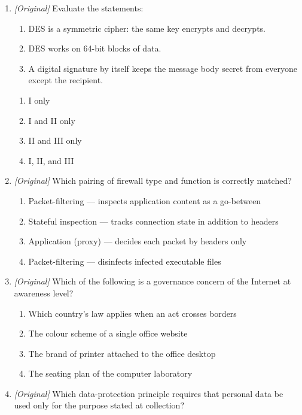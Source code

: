 \documentclass[11pt]{article}
\begin{document}
\begin{enumerate}[label=\textbf{Q\arabic*.}, leftmargin=*]
\begin{enumerate}[label=\Alph*.]
    \item Digital Data on Server
    \item Dynamic Domain of Service
  \end{enumerate}
\item \textit{[Original]} Evaluate the statements:
  \begin{enumerate}[label=\Roman*.]
    \item DES is a symmetric cipher: the same key encrypts and decrypts.
    \item DES works on 64-bit blocks of data.
    \item A digital signature by itself keeps the message body secret from everyone except the recipient.
  \end{enumerate}
  \begin{enumerate}[label=\Alph*.]
    \item I only
    \item I and II only
    \item II and III only
    \item I, II, and III
  \end{enumerate}
\item \textit{[Original]} Which pairing of firewall type and function is correctly matched?
  \begin{enumerate}[label=\Alph*.]
    \item Packet-filtering --- inspects application content as a go-between
    \item Stateful inspection --- tracks connection state in addition to headers
    \item Application (proxy) --- decides each packet by headers only
    \item Packet-filtering --- disinfects infected executable files
  \end{enumerate}
\item \textit{[Original]} Which of the following is a governance concern of the Internet at awareness level?
  \begin{enumerate}[label=\Alph*.]
    \item Which country's law applies when an act crosses borders
    \item The colour scheme of a single office website
    \item The brand of printer attached to the office desktop
    \item The seating plan of the computer laboratory
  \end{enumerate}
\item \textit{[Original]} Which data-protection principle requires that personal data be used only for the purpose stated at collection?

\end{enumerate}
\end{document}
